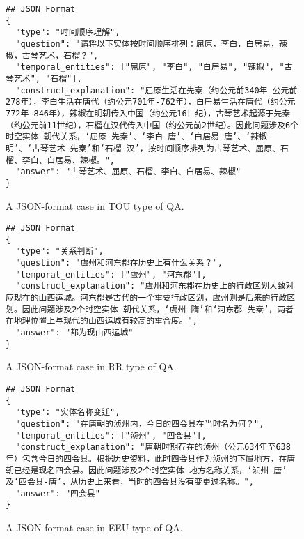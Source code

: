 \begin{figure}[H]
\begin{tcolorbox}[title={\textbf{\small Temporal Order Understanding (TOU)}}, colback=whitesmoke, colframe=royalblue(web), boxrule=2pt, arc=0mm]
{\small
\begin{verbatim}
## JSON Format
{
  "type": "时间顺序理解",
  "question": "请将以下实体按时间顺序排列：屈原，李白，白居易，辣椒，古琴艺术，石榴？",
  "temporal_entities": ["屈原", "李白", "白居易", "辣椒", "古琴艺术", "石榴"],
  "construct_explanation": "屈原生活在先秦（约公元前340年-公元前278年），李白生活在唐代（约公元701年-762年），白居易生活在唐代（约公元772年-846年），辣椒在明朝传入中国（约公元16世纪），古琴艺术起源于先秦（约公元前11世纪），石榴在汉代传入中国（约公元前2世纪）。因此问题涉及6个时空实体-朝代关系，‘屈原-先秦’、‘李白-唐’、‘白居易-唐’、‘辣椒-明’、‘古琴艺术-先秦’和‘石榴-汉’，按时间顺序排列为古琴艺术、屈原、石榴、李白、白居易、辣椒。",
  "answer": "古琴艺术、屈原、石榴、李白、白居易、辣椒"
}
\end{verbatim}
}
\end{tcolorbox}
\caption{A JSON-format case in TOU type of QA.}
\label{fig:TOU_case}
\end{figure}



\begin{figure}[H]
\begin{tcolorbox}[title={\textbf{\small Relation Reasoning (RR)}}, colback=whitesmoke, colframe=royalblue(web), boxrule=2pt, arc=0mm]
{\small
\begin{verbatim}
## JSON Format
{
  "type": "关系判断",
  "question": "虞州和河东郡在历史上有什么关系？",
  "temporal_entities": ["虞州", "河东郡"],
  "construct_explanation": "虞州和河东郡在历史上的行政区划大致对应现在的山西运城。河东郡是古代的一个重要行政区划，虞州则是后来的行政区划。因此问题涉及2个时空实体-朝代关系，‘虞州-隋’和‘河东郡-先秦’，两者在地理位置上与现代的山西运城有较高的重合度。",
  "answer": "都为现山西运城"
}
\end{verbatim}
}
\end{tcolorbox}
\caption{A JSON-format case in RR type of QA.}
\label{fig:RR_case}
\end{figure}


\begin{figure}[t]
\begin{tcolorbox}[title={\textbf{\small Entity Evolution Understanding (EEU)}}, colback=whitesmoke, colframe=royalblue(web), boxrule=2pt, arc=0mm]
{\small
\begin{verbatim}
## JSON Format
{
  "type": "实体名称变迁",
  "question": "在唐朝的浈州内，今日的四会县在当时名为何？",
  "temporal_entities": ["浈州", "四会县"],
  "construct_explanation": "唐朝时期存在的浈州（公元634年至638年）包含今日的四会县。根据历史资料，此时四会县作为浈州的下属地方，在唐朝已经是现名四会县。因此问题涉及2个时空实体-地方名称关系，‘浈州-唐’ 及‘四会县-唐’，从历史上来看，当时的四会县没有变更过名称。",
  "answer": "四会县"
}
\end{verbatim}
}
\end{tcolorbox}
\caption{A JSON-format case in EEU type of QA.}
\label{fig:EEU_case}
\end{figure}


